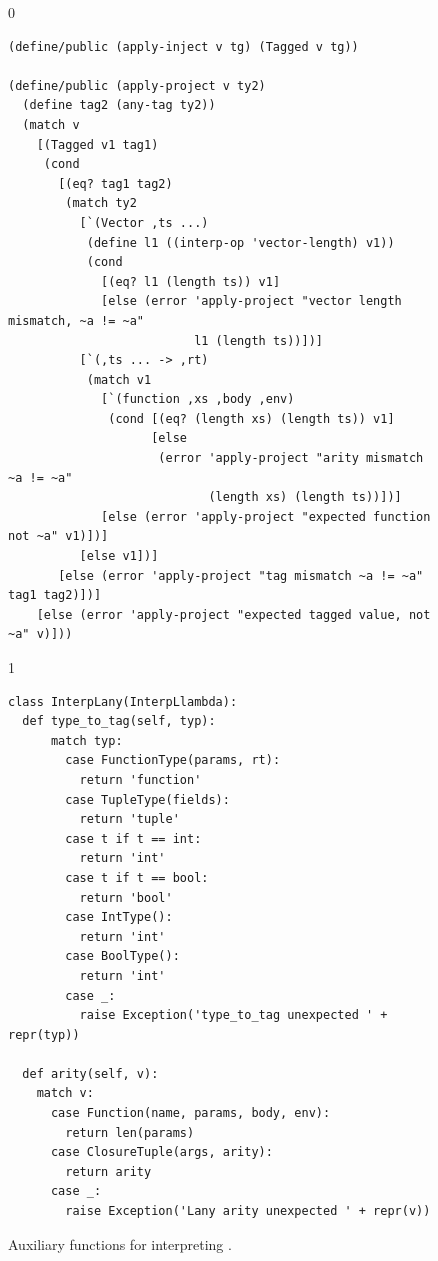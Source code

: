 \documentclass[7x10]{TimesAPriori_MIT}%
\def\racketEd{0}
\def\pythonEd{1}
\def\edition{1}
\newcommand{\pythonColor}[0]{}
\numberwithin{theorem}{chapter}
\numberwithin{definition}{chapter}
\numberwithin{equation}{chapter}
\begin{document}
\begin{figure}[tbp]
  \begin{tcolorbox}[colback=white]  
{\if\edition\racketEd
\begin{lstlisting}[basicstyle=\ttfamily\footnotesize]
(define/public (apply-inject v tg) (Tagged v tg))

(define/public (apply-project v ty2)
  (define tag2 (any-tag ty2))
  (match v
    [(Tagged v1 tag1)
     (cond
       [(eq? tag1 tag2)
        (match ty2
          [`(Vector ,ts ...)
           (define l1 ((interp-op 'vector-length) v1))
           (cond
             [(eq? l1 (length ts)) v1]
             [else (error 'apply-project "vector length mismatch, ~a != ~a"
                          l1 (length ts))])]
          [`(,ts ... -> ,rt)
           (match v1
             [`(function ,xs ,body ,env)
              (cond [(eq? (length xs) (length ts)) v1]
                    [else
                     (error 'apply-project "arity mismatch ~a != ~a"
                            (length xs) (length ts))])]
             [else (error 'apply-project "expected function not ~a" v1)])]
          [else v1])]
       [else (error 'apply-project "tag mismatch ~a != ~a" tag1 tag2)])]
    [else (error 'apply-project "expected tagged value, not ~a" v)]))
\end{lstlisting}
\fi}
{\if\edition\pythonEd\pythonColor
\begin{lstlisting}
class InterpLany(InterpLlambda):
  def type_to_tag(self, typ):
      match typ:
        case FunctionType(params, rt):
          return 'function'
        case TupleType(fields):
          return 'tuple'
        case t if t == int:
          return 'int'
        case t if t == bool:
          return 'bool'
        case IntType():
          return 'int'
        case BoolType():
          return 'int'
        case _:
          raise Exception('type_to_tag unexpected ' + repr(typ))

  def arity(self, v):
    match v:
      case Function(name, params, body, env):
        return len(params)
      case ClosureTuple(args, arity):
        return arity
      case _:
        raise Exception('Lany arity unexpected ' + repr(v))
\end{lstlisting}
\fi}
  \end{tcolorbox}

  \caption{Auxiliary functions for interpreting \LangAny{}.}
  \label{fig:interp-Lany-aux}
\end{figure}

\clearpage
\end{document}
